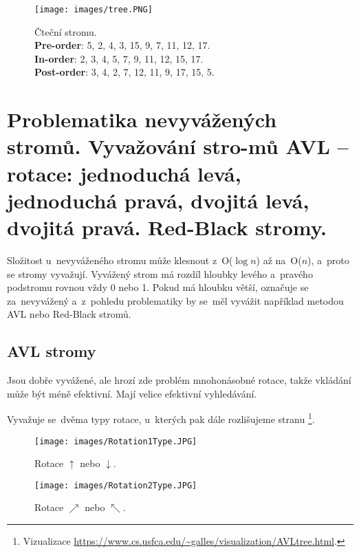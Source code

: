 \begin{figure}[ht]
	\centering
	\texttt{[image: images/tree.PNG]}
	\caption{
		Čteční stromu. \\
		\textbf{Pre-order}: 5, 2, 4, 3, 15, 9, 7, 11, 12, 17. \\
		\textbf{In-order}: 2, 3, 4, 5, 7, 9, 11, 12, 15, 17. \\
		\textbf{Post-order}: 3, 4, 2, 7, 12, 11, 9, 17, 15, 5. \\
	}
	\label{tree}
\end{figure}

\clearpage
\section[Problematika nevyvážených stromů. Vyvažování stromů AVL - rotace: jednoduchá levá, jednoduchá pravá, dvojitá levá, dvojitá pravá. Red-Black stromy]{Problematika nevyvážených stromů. Vyvažování stro-mů AVL -- rotace: jednoduchá levá, jednoduchá pravá, dvojitá levá, dvojitá pravá. Red-Black stromy.
 }

Složitost u~nevyváženého stromu může klesnout z~O(\( \log{n} \)) až na~O(\( n \)), a~proto se stromy vyvažují. Vyvážený strom má rozdíl hloubky levého a~pravého podstromu rovnou vždy 0 nebo 1. Pokud má hloubku větší, označuje se za~nevyvážený a~z~pohledu problematiky by se~měl vyvážit například metodou AVL nebo Red-Black stromů.

\subsection{AVL stromy}

Jsou dobře vyvážené, ale hrozí zde problém mnohonásobné rotace, takže vkládání může být méně efektivní. Mají velice efektivní vyhledávání.

Vyvažuje se~dvěma typy rotace, u~kterých pak dále rozlišujeme stranu%
\footnote{Vizualizace \url{https://www.cs.usfca.edu/~galles/visualization/AVLtree.html}.}.

\begin{figure}[ht]
	\begin{minipage}[b]{0.47\textwidth}
		\texttt{[image: images/Rotation1Type.JPG]}
		\caption{Rotace \( \uparrow \) nebo \( \downarrow \).}
	\end{minipage}
	\hspace*{1em}%
	\begin{minipage}[b]{0.47\textwidth}
		\texttt{[image: images/Rotation2Type.JPG]}
		\caption{Rotace \( \nearrow \) nebo \( \nwarrow \).}
	\end{minipage}
\end{figure}

